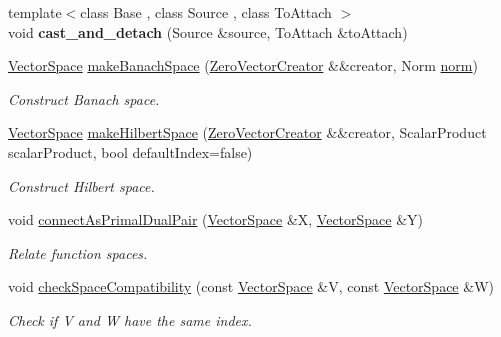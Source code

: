 \begin{DoxyCompactItemize}
\item 
\hypertarget{namespaceSpacy_a8cb35e7115d5c299e260e7c196770df9}{{\footnotesize template$<$class Base , class Source , class To\-Attach $>$ }\\void {\bfseries cast\-\_\-and\-\_\-detach} (\-Source \&source, \-To\-Attach \&to\-Attach)}\label{namespaceSpacy_a8cb35e7115d5c299e260e7c196770df9}

\item 
\hypertarget{namespaceSpacy_a0b66c8f2345b693504180dc7fb187958}{\hyperlink{classSpacy_1_1VectorSpace}{\-Vector\-Space} \hyperlink{namespaceSpacy_a0b66c8f2345b693504180dc7fb187958}{make\-Banach\-Space} (\hyperlink{classSpacy_1_1ZeroVectorCreator}{\-Zero\-Vector\-Creator} \&\&creator, \-Norm \hyperlink{namespaceSpacy_a86a4fc266aa19a07b0af16388907354b}{norm})}\label{namespaceSpacy_a0b66c8f2345b693504180dc7fb187958}

\begin{DoxyCompactList}\small\item\em \-Construct \-Banach space. \end{DoxyCompactList}\item 
\hypertarget{namespaceSpacy_a927756dd42df3e79c302df1f8f635b65}{\hyperlink{classSpacy_1_1VectorSpace}{\-Vector\-Space} \hyperlink{namespaceSpacy_a927756dd42df3e79c302df1f8f635b65}{make\-Hilbert\-Space} (\hyperlink{classSpacy_1_1ZeroVectorCreator}{\-Zero\-Vector\-Creator} \&\&creator, \-Scalar\-Product scalar\-Product, bool default\-Index=false)}\label{namespaceSpacy_a927756dd42df3e79c302df1f8f635b65}

\begin{DoxyCompactList}\small\item\em \-Construct \-Hilbert space. \end{DoxyCompactList}\item 
void \hyperlink{namespaceSpacy_a72844d3d381380c382cd9dce912e2664}{connect\-As\-Primal\-Dual\-Pair} (\hyperlink{classSpacy_1_1VectorSpace}{\-Vector\-Space} \&\-X, \hyperlink{classSpacy_1_1VectorSpace}{\-Vector\-Space} \&\-Y)
\begin{DoxyCompactList}\small\item\em \-Relate function spaces. \end{DoxyCompactList}\item 
void \hyperlink{namespaceSpacy_aae18423491adef608743902f1c40844e}{check\-Space\-Compatibility} (const \hyperlink{classSpacy_1_1VectorSpace}{\-Vector\-Space} \&\-V, const \hyperlink{classSpacy_1_1VectorSpace}{\-Vector\-Space} \&\-W)
\begin{DoxyCompactList}\small\item\em \-Check if \-V and \-W have the same index. \end{DoxyCompactList}\end{DoxyCompactItemize}


